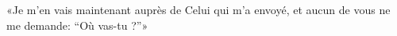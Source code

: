 \encetemps \jesusdisciples
	«Je m’en vais maintenant auprès de Celui qui m’a envoyé,
	et aucun de vous ne me demande: “Où vas-tu ?”»
